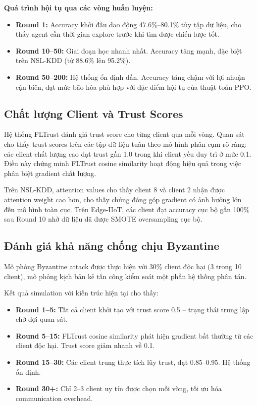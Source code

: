 \documentclass[12pt,a4paper]{article}
\begin{document}
\textbf{Quá trình hội tụ qua các vòng huấn luyện:}

\begin{itemize}
    \item \textbf{Round 1:} Accuracy khởi đầu dao động 47.6\%--80.1\% tùy tập dữ liệu, cho thấy agent cần thời gian explore trước khi tìm được chiến lược tốt.
    \item \textbf{Round 10--50:} Giai đoạn học nhanh nhất. Accuracy tăng mạnh, đặc biệt trên NSL-KDD (từ 88.6\% lên 95.2\%).
    \item \textbf{Round 50--200:} Hệ thống ổn định dần. Accuracy tăng chậm với lợi nhuận cận biên, đạt mức bão hòa phù hợp với đặc điểm hội tụ của thuật toán PPO.
\end{itemize}

\subsection{Chất lượng Client và Trust Scores}

Hệ thống FLTrust đánh giá trust score cho từng client qua mỗi vòng. Quan sát cho thấy trust scores trên các tập dữ liệu tuân theo mô hình phân cụm rõ ràng: các client chất lượng cao đạt trust gần 1.0 trong khi client yếu duy trì ở mức 0.1. Điều này chứng minh FLTrust cosine similarity hoạt động hiệu quả trong việc phân biệt gradient chất lượng.

Trên NSL-KDD, attention values cho thấy client 8 và client 2 nhận được attention weight cao hơn, cho thấy chúng đóng góp gradient có ảnh hưởng lớn đến mô hình toàn cục. Trên Edge-IIoT, các client đạt accuracy cục bộ gần 100\% sau Round 10 nhờ dữ liệu đã được SMOTE oversampling cục bộ.

\subsection{Đánh giá khả năng chống chịu Byzantine}

Mô phỏng Byzantine attack được thực hiện với 30\% client độc hại (3 trong 10 client), mô phỏng kịch bản kẻ tấn công kiểm soát một phần hệ thống phân tán.

Kết quả simulation với kiến trúc hiện tại cho thấy:

\begin{itemize}
    \item \textbf{Round 1--5:} Tất cả client khởi tạo với trust score 0.5 -- trạng thái trung lập chờ đợi quan sát.
    \item \textbf{Round 5--15:} FLTrust cosine similarity phát hiện gradient bất thường từ các client độc hại. Trust score giảm nhanh về 0.1.
    \item \textbf{Round 15--30:} Các client trung thực tích lũy trust, đạt 0.85--0.95. Hệ thống ổn định.
    \item \textbf{Round 30+:} Chỉ 2--3 client uy tín được chọn mỗi vòng, tối ưu hóa communication overhead.
\end{itemize}
\end{document}
